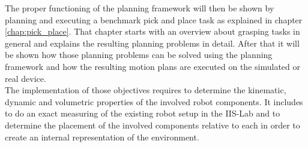 The proper functioning of the planning framework will then be shown by planning and executing a benchmark pick and place task as explained in chapter \ref{chap:pick_place}. That chapter starts with an overview about grasping tasks in general and explains the resulting planning problems in detail. After that it will be shown how those planning problems can be solved using the planning framework and how the resulting motion plans are executed on the simulated or real device.\\

The implementation of those objectives requires to determine the kinematic, dynamic and volumetric properties of the involved robot components. It includes to do an exact measuring of the existing robot setup in the IIS-Lab and to determine the placement of the involved components relative to each in order to create an internal representation of the environment. 

